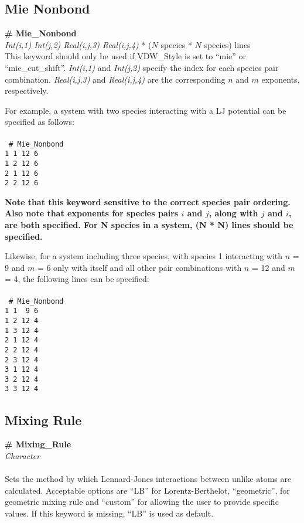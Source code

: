 \subsection{Mie Nonbond}\label{sec:Mie_Nonbond}
{\bf \# Mie\_Nonbond} \\
{\it Int(i,1) Int(j,2) Real(i,j,3) Real(i,j,4)} * ($N$ species * $N$ species) lines \\ 

This keyword should only be used if VDW\_Style is set to ``mie'' or ``mie\_cut\_shift''.
\textit{Int(i,1)} and \textit{Int(j,2)} specify the index for each species pair combination.  \textit{Real(i,j,3)} and \textit{Real(i,j,4)} are the corresponding $n$ and $m$ exponents, respectively. 

For example, a system with two species interacting with a LJ potential can be specified as follows:\\ \\
\texttt{
\# Mie\_Nonbond \\
1 1 12 6 \\
1 2 12 6 \\
2 1 12 6 \\
2 2 12 6
}

\textbf{Note that this keyword sensitive to the correct species pair ordering. Also note that exponents for species pairs $i$ and $j$, along with $j$ and $i$, are both specified. For N species in a system, (N * N) lines should be specified.}


Likewise, for a system including three species, with species 1 interacting with $n$ = 9 and $m$ = 6 only with itself and all other pair combinations with $n$ = 12 and $m$ = 4, the following lines can be specified: \\ \\
\texttt{
\# Mie\_Nonbond \\
1 1 \ 9 6 \\
1 2 12 4 \\
1 3 12 4 \\
2 1 12 4 \\
2 2 12 4 \\
2 3 12 4 \\
3 1 12 4 \\
3 2 12 4 \\
3 3 12 4
}
%
%
%
\subsection{Mixing Rule}\label{Mixing_Rule}
{\bf \# Mixing\_Rule} \\
{\it Character} \\ \\
%
Sets the method by which Lennard-Jones interactions between unlike atoms are
calculated. Acceptable options are ``LB''  for Lorentz-Berthelot,
``geometric'', for geometric mixing rule and ``custom'' for allowing the user to provide specific values. 
If this keyword is missing, ``LB'' is used as default. \\

